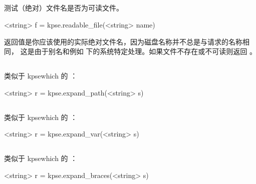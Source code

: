 \subsection{}


测试（绝对）文件名是否为可读文件。

\begin{typing}
<string> f = kpse.readable_file(<string> name)
\end{typing}

返回值是你应该使用的实际绝对文件名，因为磁盘名称并不总是与请求的名称相同，
这是由于别名和例如 \MSDOS 下的系统特定处理。如果文件不存在或不可读则返回
。

\subsection{}


类似于 kpsewhich 的 ：

\begin{typing}
<string> r = kpse.expand_path(<string> s)
\end{typing}

\subsection{}


类似于 kpsewhich 的 ：

\begin{typing}
<string> r = kpse.expand_var(<string> s)
\end{typing}

\subsection{}


类似于 kpsewhich 的 ：

\begin{typing}
<string> r = kpse.expand_braces(<string> s)
\end{typing}

\subsection{}

